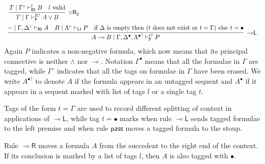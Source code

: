 \documentclass[submission,copyright,creativecommons]{eptcs}
\theoremstyle{definition}
\newcommand{\lright}{{\multimap}\mathsf{R}}
\newcommand{\lleft}{{\multimap}\mathsf{L}}
\newcommand{\pass}{\mathsf{pass}}
\newcommand{\orrtwo}{\lor \mathsf{R}_{2}}
\newcommand{\lolli}{\multimap}
\newcommand{\RI}{\mathsf{RI}}
\newcommand{\LI}{\mathsf{LI}}
\newcommand{\F}{\mathsf{F}}
\newcommand{\tP}{\mathbb{P}}
\newcommand{\tE}{\mathbb{R}}
\begin{document}
\begin{equation}
\begin{array}{lc}
{{    }
    \;
    \infer[\orrtwo]{T \mid \Gamma \vdash^{\tE?}_{\F} A \lor B}{
      T \mid \Gamma^{\circ} \vdash^{l}_{\RI} B
      &
      l \ \text{valid}
    }
    }
    \\[6pt]
    \multicolumn{2}{c}{
      \infer[\lleft]{A \lolli B \mid \Gamma , \Delta^{\bullet} , \Lambda^{\bullet?} \vdash^{t?}_{\F} P}{
        - \mid \Gamma , \Delta^{\circ} \vdash_{\RI} A
        &
        B \mid \Lambda^{\circ} \vdash_{\LI} P
        &
        \text{if } \Delta \text{ is empty then } (t \text{ does not exist or } t =  \Gamma)  \text{ else }  t = \bullet 
      }
    }
  \end{array}
\end{equation}
Again $P$ indicates a non-negative formula, which now means that its principal connective is neither $\land$ nor $\lolli$. Notation $\Gamma^{\bullet}$ means that all the formulae in $\Gamma$ are tagged, while $\Gamma^{\circ}$ indicates that all the tags on formulae in $\Gamma$ have been erased. We write $A^{\bullet?}$ to denote $A$ if the formula appears in an untagged sequent and $A^\bullet$ if it appears in a sequent marked with list of tags $l$ or a single tag $t$.

Tags of the form $t = \Gamma$ are used to record different splitting of context in applications of $\lleft$, while tag $t = \bullet$ marks when rule $\lleft$ sends tagged formulae to the left premise and when rule $\pass$ moves a tagged formula to the stoup.

Rule $\lright$  moves a formula $A$ from the succedent to the right end of the context. If its conclusion is marked by a list of tags $l$, then $A$ is also tagged with $\bullet$.
\end{document}
